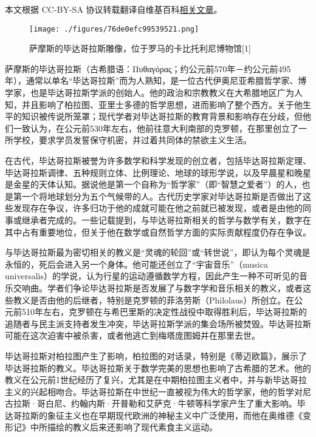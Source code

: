 
本文根据 CC-BY-SA 协议转载翻译自维基百科\href{https://en.wikipedia.org/wiki/Pythagoras}{相关文章}。

\begin{figure}[ht]
\centering
\texttt{[image: ./figures/76de0efc99539521.png]}
\caption{萨摩斯的毕达哥拉斯雕像，位于罗马的卡比托利尼博物馆[1]} \label{fig_Pythag_1}
\end{figure}
萨摩斯的毕达哥拉斯（古希腊语：Πυθαγόρας；约公元前570年－约公元前495年），通常以单名“毕达哥拉斯”而为人熟知，是一位古代伊奥尼亚希腊哲学家、博学家，也是毕达哥拉斯学派的创始人。他的政治和宗教教义在大希腊地区广为人知，并且影响了柏拉图、亚里士多德的哲学思想，进而影响了整个西方。关于他生平的知识被传说所笼罩；现代学者对毕达哥拉斯的教育背景和影响存在分歧，但他们一致认为，在公元前530年左右，他前往意大利南部的克罗顿，在那里创立了一所学校，要求学员发誓保守机密，并过着共同体的禁欲主义生活。

在古代，毕达哥拉斯被誉为许多数学和科学发现的创立者，包括毕达哥拉斯定理、毕达哥拉斯调律、五种规则立体、比例理论、地球的球形学说，以及早晨星和晚星是金星的天体认知。据说他是第一个自称为“哲学家”（即“智慧之爱者”）的人，也是第一个将地球划分为五个气候带的人。古代历史学家对毕达哥拉斯是否做出了这些发现存在争议，许多归功于他的成就可能在他之前就已被发现，或者是由他的同事或继承者完成的。一些记载提到，与毕达哥拉斯相关的哲学与数学有关，数字在其中占有重要地位，但关于他在数学或自然哲学方面的实际贡献程度仍存在争议。

与毕达哥拉斯最为密切相关的教义是“灵魂的轮回”或“转世说”，即认为每个灵魂是永恒的，死后会进入另一个身体。他可能还创立了“宇宙音乐”（musica universalis）的学说，认为行星的运动遵循数学方程，因此产生一种不可听见的音乐交响曲。学者们争论毕达哥拉斯是否发展了与数字学和音乐相关的教义，或者这些教义是否由他的后继者，特别是克罗顿的菲洛劳斯（Philolaus）所创立。在公元前510年左右，克罗顿在与希巴里斯的决定性战役中取得胜利后，毕达哥拉斯的追随者与民主派支持者发生冲突，毕达哥拉斯学派的集会场所被焚毁。毕达哥拉斯可能在这次迫害中被杀害，或者他逃亡到梅塔庞图姆并在那里去世。

毕达哥拉斯对柏拉图产生了影响，柏拉图的对话录，特别是《蒂迈欧篇》，展示了毕达哥拉斯的教义。毕达哥拉斯关于数学完美的思想也影响了古希腊的艺术。他的教义在公元前1世纪经历了复兴，尤其是在中期柏拉图主义者中，并与新毕达哥拉主义的兴起相吻合。毕达哥拉斯在中世纪一直被视为伟大的哲学家，他的哲学对尼古拉斯·哥白尼、约翰内斯·开普勒和艾萨克·牛顿等科学家产生了重大影响。毕达哥拉斯的象征主义也在早期现代欧洲的神秘主义中广泛使用，而他在奥维德《变形记》中所描绘的教义后来还影响了现代素食主义运动。
